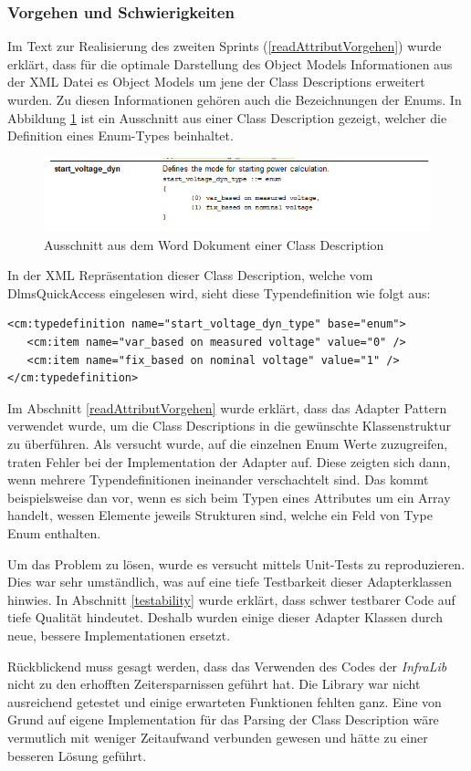 \subsubsection{Vorgehen und Schwierigkeiten}
Im Text zur Realisierung des zweiten Sprints (\ref{readAttributVorgehen}) wurde erklärt, dass für die optimale Darstellung des Object Models Informationen aus der XML Datei es Object Models um jene der Class Descriptions erweitert wurden.
Zu diesen Informationen gehören auch die Bezeichnungen der Enums.
In Abbildung \ref{fig:enumTypedefword} ist ein Ausschnitt aus einer Class Description gezeigt, welcher die Definition eines Enum-Types beinhaltet.
\begin{figure}
   \centering
   \includegraphics[width=1.0\textwidth]{gfx/enum_typedef_word.png}
   \caption{
      Ausschnitt aus dem Word Dokument einer Class Description
      }
      \label{fig:enumTypedefword}
\end{figure}
In der XML Repräsentation dieser Class Description, welche vom DlmsQuickAccess eingelesen wird, sieht diese Typendefinition wie folgt aus:
\begin{verbatim}
<cm:typedefinition name="start_voltage_dyn_type" base="enum">
   <cm:item name="var_based on measured voltage" value="0" />
   <cm:item name="fix_based on nominal voltage" value="1" />
</cm:typedefinition>
\end{verbatim}

Im Abschnitt \ref{readAttributVorgehen} wurde erklärt, dass das Adapter Pattern verwendet wurde, um die Class Descriptions in die gewünschte Klassenstruktur zu überführen.
Als versucht wurde, auf die einzelnen Enum Werte zuzugreifen, traten Fehler bei der Implementation der Adapter auf.
Diese zeigten sich dann, wenn mehrere Typendefinitionen ineinander verschachtelt sind.
Das kommt beispielsweise dan vor, wenn es sich beim Typen eines Attributes um ein Array handelt, wessen Elemente jeweils Strukturen sind, welche ein Feld von Type Enum enthalten.

Um das Problem zu lösen, wurde es versucht mittels Unit-Tests zu reproduzieren.
Dies war sehr umständlich, was auf eine tiefe Testbarkeit dieser Adapterklassen hinwies.
In Abschnitt \ref{testability} wurde erklärt, dass schwer testbarer Code auf tiefe Qualität hindeutet.
Deshalb wurden einige dieser Adapter Klassen durch neue, bessere Implementationen ersetzt.

Rückblickend muss gesagt werden, dass das Verwenden des Codes der \textit{InfraLib} nicht zu den erhofften Zeitersparnissen geführt hat.
Die Library war nicht ausreichend getestet und einige erwarteten Funktionen fehlten ganz.
Eine von Grund auf eigene Implementation für das Parsing der Class Description wäre vermutlich mit weniger Zeitaufwand verbunden gewesen und hätte zu einer besseren Lösung geführt.
